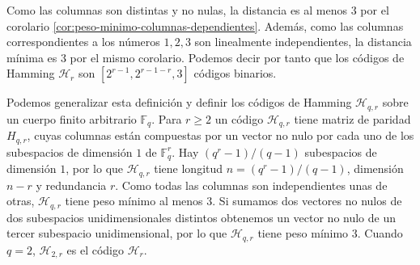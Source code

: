 Como las columnas son distintas y no nulas, la distancia es al menos \(3\) por el corolario \ref{cor:peso-minimo-columnas-dependientes}.
Además, como las columnas correspondientes a los números \(1, 2, 3\) son linealmente independientes, la distancia mínima es 3 por el mismo corolario.
Podemos decir por tanto que los códigos de Hamming \(\mathcal H_r\) son \([2^{r-1}, 2^{r-1-r}, 3]\) códigos binarios.

Podemos generalizar esta definición y definir los códigos de Hamming \(\mathcal H_{q,r}\) sobre un cuerpo finito arbitrario \(\mathbb F_q\). 
Para \(r \geq 2\) un código \(\mathcal H_{q,r}\) tiene matriz de paridad \(H_{q,r}\), cuyas columnas están compuestas por un vector no nulo por cada uno de los subespacios de dimensión \(1\) de \(\mathbb F_q^r\).
Hay \((q^r-1)/(q-1)\) subespacios de dimensión \(1\), por lo que \(\mathcal H_{q,r}\) tiene longitud \(n = (q^r-1)/(q-1)\), dimensión \(n-r\) y redundancia \(r\).
Como todas las columnas son independientes unas de otras, \(\mathcal H_{q,r}\) tiene peso mínimo al menos 3.
Si sumamos dos vectores no nulos de dos subespacios unidimensionales distintos obtenemos un vector no nulo de un tercer subespacio unidimensional, por lo que \(\mathcal H_{q,r}\) tiene peso mínimo 3. 
Cuando \(q = 2\), \(\mathcal H_{2,r}\) es el código \(\mathcal H_r\).